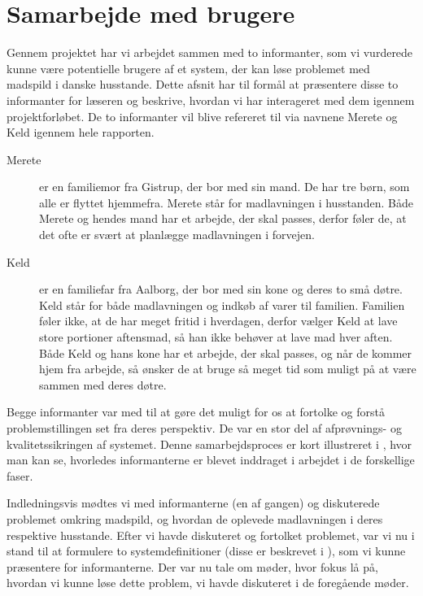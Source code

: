 \section{Samarbejde med brugere}
\label{sec:samarbejde}

Gennem projektet har vi arbejdet sammen med to informanter, som vi vurderede kunne være potentielle brugere af et system, der kan løse problemet med madspild i danske husstande. Dette afsnit har til formål at præsentere disse to informanter for læseren og beskrive, hvordan vi har interageret med dem igennem projektforløbet. De to informanter vil blive refereret til via navnene Merete og Keld igennem hele rapporten.

\begin{description}
\item[Merete] er en familiemor fra Gistrup, der bor med sin mand. De har tre børn, som alle er flyttet hjemmefra. Merete står for madlavningen i husstanden. Både Merete og hendes mand har et arbejde, der skal passes, derfor føler de, at det ofte er svært at planlægge madlavningen i forvejen.

\item[Keld] er en familiefar fra Aalborg, der bor med sin kone og deres to små døtre. Keld står for både madlavningen og indkøb af varer til familien. Familien føler ikke, at de har meget fritid i hverdagen, derfor vælger Keld at lave store portioner aftensmad, så han ikke behøver at lave mad hver aften. Både Keld og hans kone har et arbejde, der skal passes, og når de kommer hjem fra arbejde, så ønsker de at bruge så meget tid som muligt på at være sammen med deres døtre.
\end{description}

Begge informanter var med til at gøre det muligt for os at fortolke og forstå problemstillingen set fra deres perspektiv. De var en stor del af afprøvnings- og kvalitetssikringen af systemet. Denne samarbejdsproces er kort illustreret i , hvor man kan se, hvorledes informanterne er blevet inddraget i arbejdet i de forskellige faser.

Indledningsvis mødtes vi med informanterne (en af gangen) og diskuterede problemet omkring madspild, og hvordan de oplevede madlavningen i deres respektive husstande. Efter vi havde diskuteret og fortolket problemet, var vi nu i stand til at formulere to systemdefinitioner (disse er beskrevet i ), som vi kunne præsentere for informanterne. Der var nu tale om møder, hvor fokus lå på, hvordan vi kunne løse dette problem, vi havde diskuteret i de foregående møder. 

